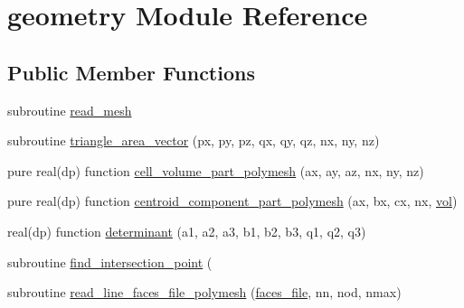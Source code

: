 \hypertarget{classgeometry}{\section{geometry Module Reference}
\label{classgeometry}
}
\subsection*{Public Member Functions}
\begin{DoxyCompactItemize}
\item 
subroutine \hyperlink{classgeometry_a6f11cfdf3b8f94b5dda77b3330f6428c}{read\-\_\-mesh}
\item 
subroutine \hyperlink{classgeometry_a5b97404630e45caf9cfe42e5986e1610}{triangle\-\_\-area\-\_\-vector} (px, py, pz, qx, qy, qz, nx, ny, nz)
\item 
pure real(dp) function \hyperlink{classgeometry_aecc1816d6f36536e7d0c6466597a621d}{cell\-\_\-volume\-\_\-part\-\_\-polymesh} (ax, ay, az, nx, ny, nz)
\item 
pure real(dp) function \hyperlink{classgeometry_a4e6945c0ecfba5f8bfd4426f0857eb74}{centroid\-\_\-component\-\_\-part\-\_\-polymesh} (ax, bx, cx, nx, \hyperlink{classgeometry_a4d57310a2f6f4431e6ec39d9633b3cc5}{vol})
\item 
real(dp) function \hyperlink{classgeometry_a23fc43cb57a6a3ff4ab9c1261b85ff9f}{determinant} (a1, a2, a3, b1, b2, b3, q1, q2, q3)
\item 
subroutine \hyperlink{classgeometry_aa93eef6306028fbc41a72afa77219e42}{find\-\_\-intersection\-\_\-point} (
\item 
subroutine \hyperlink{classgeometry_a26addf2bfa77af939dd112214572338b}{read\-\_\-line\-\_\-faces\-\_\-file\-\_\-polymesh} (\hyperlink{classgeometry_af70942cfbb3d083b361d7c30d7c7d1b8}{faces\-\_\-file}, nn, nod, nmax)
\end{DoxyCompactItemize}
